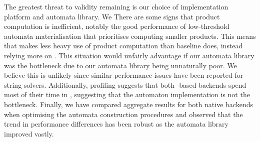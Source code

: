 The greatest threat to validity remaining is our choice of implementation
platform and automata library. We There are some signs that product computation
is inefficient, notably the good performance of low-threshold automata
materialisation that prioritises computing smaller products. This means that
\Calculus{} makes less heavy use of product computation than baseline does,
instead relying more on \Princess{}. This situation would unfairly advantage
\Calculus{} if our automata library was the bottleneck due to our automata
library being unnaturally poor. We believe this is unlikely since similar
performance issues have been reported for string solvers. Additionally,
profiling suggests that both \Princess{}-based backends spend most of their time
in \Princess{}, suggesting that the automaton implementation is not the
bottleneck. Finally, we have compared aggregate results for both native backends
when optimising the automata construction procedures and observed that the trend
in performance differences has been robust as the automata library improved
vastly.